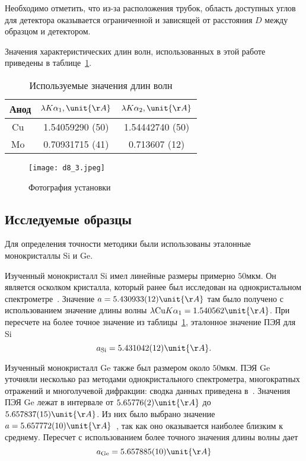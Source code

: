 Необходимо отметить, что из-за расположения трубок, область доступных углов для детектора оказывается ограниченной и зависящей от расстояния $D$ между образцом и детектором.

Значения характеристических длин волн, использованных в этой работе приведены в таблице~\ref{tab:wavelengths}.

\begin{table}[h]
    \centering
    \begin{tabular}{|c|c|c|}
        \hline
        Анод & $\lambda K\alpha_1,\unit{\AA}$ & $\lambda K\alpha_2,\unit{\AA}$ \\
        \hline
        Cu~\cite{Holzer:1997} & 1.54059290 (50) & 1.54442740 (50) \\
        Mo~\cite{Deslattes:1985} & 0.70931715 (41) & 0.713607 (12) \\
        \hline
    \end{tabular}
    \caption{Используемые значения длин волн}
    \label{tab:wavelengths}
\end{table}

\begin{figure}[h]
    \centering
    \texttt{[image: d8\_3.jpeg]}
    \caption{Фотография установки}
    \label{fig:D8_photo}
\end{figure}

\subsection{Исследуемые образцы}
Для определения точности методики были использованы эталонные монокристаллы Si и Ge.

Изученный монокристалл Si имел линейные размеры примерно $50 \unit{мкм}$.
Он является осколком кристалла, который ранее был исследован на однокристальном спектрометре~\cite{Lisoivan:1982}.
Значение $a = 5.430933(12)\unit{\AA}$ там было получено с использованием значение длины волны $\lambda \text{Cu} K \alpha_1 = 1.540562\unit{\AA}$.
При пересчете на более точное значение из таблицы~\ref{tab:wavelengths}, эталонное значение ПЭЯ для Si
\[ a_\text{Si} = 5.431042 (12)\unit{\AA}. \]

Изученный монокристалл Ge также был размером около $50 \unit{мкм}$.
ПЭЯ Ge уточняли несколько раз методами однокристального спектрометра, многократных отражений и многолучевой дифракции: сводка данных приведена в~\cite{Lisoivan:1982}.
Значения ПЭЯ Ge лежат в интервале от $5.65776 (2) \unit{\AA}$ до $5.657837 (15) \unit{\AA}$.
Из них было выбрано значение $a = 5.657772 (10) \unit{\AA}$~\cite{Cooper:1962}, так как оно оказывается наиболее близким к среднему.
Пересчет с использованием более точного значения длины волны дает
\[ a_\text{Ge} = 5.657885 (10)\unit{\AA} \]

